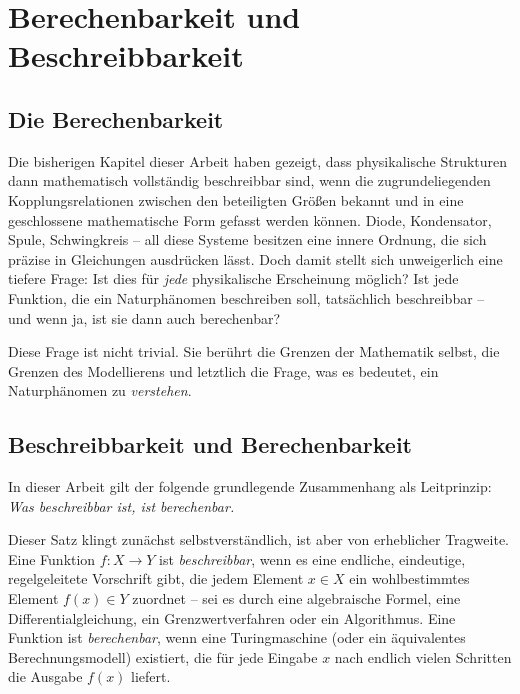 ﻿\documentclass[12pt, a4paper]{article}
\begin{document}
	\section{Berechenbarkeit und Beschreibbarkeit}
	\label{sec:berechenbarkeit}

	\subsection{Die Berechenbarkeit}

	Die bisherigen Kapitel dieser Arbeit haben gezeigt, dass physikalische Strukturen dann mathematisch vollständig beschreibbar sind, wenn die zugrundeliegenden Kopplungsrelationen zwischen den beteiligten Größen bekannt und in eine geschlossene mathematische Form gefasst werden können. Diode, Kondensator, Spule, Schwingkreis -- all diese Systeme besitzen eine innere Ordnung, die sich präzise in Gleichungen ausdrücken lässt. Doch damit stellt sich unweigerlich eine tiefere Frage: Ist dies für \textit{jede} physikalische Erscheinung möglich? Ist jede Funktion, die ein Naturphänomen beschreiben soll, tatsächlich beschreibbar -- und wenn ja, ist sie dann auch berechenbar?

	Diese Frage ist nicht trivial. Sie berührt die Grenzen der Mathematik selbst, die Grenzen des Modellierens und letztlich die Frage, was es bedeutet, ein Naturphänomen zu \textit{verstehen}.

	\subsection{Beschreibbarkeit und Berechenbarkeit}

	In dieser Arbeit gilt der folgende grundlegende Zusammenhang als Leitprinzip: \textit{Was beschreibbar ist, ist berechenbar.}

	Dieser Satz klingt zunächst selbstverständlich, ist aber von erheblicher Tragweite. Eine Funktion $f: X \to Y$ ist \textit{beschreibbar}, wenn es eine endliche, eindeutige, regelgeleitete Vorschrift gibt, die jedem Element $x \in X$ ein wohlbestimmtes Element $f(x) \in Y$ zuordnet -- sei es durch eine algebraische Formel, eine Differentialgleichung, ein Grenzwertverfahren oder ein Algorithmus. Eine Funktion ist \textit{berechenbar}, wenn eine Turingmaschine (oder ein äquivalentes Berechnungsmodell) existiert, die für jede Eingabe $x$ nach endlich vielen Schritten die Ausgabe $f(x)$ liefert.
\end{document}
